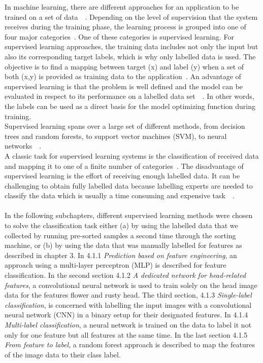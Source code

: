 In machine learning, there are different approaches for an application to be trained on a set of data~\citep{geron2019hands}~\citep{bishop2006pattern}. Depending on the level of supervision that the system receives during the training phase, the learning process is grouped into one of four major categories~\citep{geron2019hands}. One of these categories is supervised learning. For supervised learning approaches, the training data includes not only the input but also its corresponding target labels, which is why only labelled data is used. The objective is to find a mapping between target (x) and label (y) when a set of both (x,y) is provided as training data to the application~\citep{olivier2006semi}. An advantage of supervised learning is that the problem is well defined and the model can be evaluated in respect to its performance on a labelled data set~\citep{daume2012course}~\citep{olivier2006semi}. In other words, the labels can be used as a direct basis for the model optimizing function during training. \\
Supervised learning spans over a large set of different methods, from decision trees and random forests, to support vector machines (SVM), to neural networks~\citep{caruana2006comparison}~\citep{geron2019hands}. \\
A classic task for supervised learning systems is the classification of received data and mapping it to one of a finite number of categories~\citep{bishop2006pattern}.
The disadvantage of supervised learning is the effort of receiving enough labelled data. It can be challenging to obtain fully labelled data because labelling experts are needed to classify the data which is usually a time consuming and expensive task~\citep{zhu05survey}~\citep{figueroa2012predicting}. \\
\\
In the following subchapters, different supervised learning methods were chosen to solve the classification task either (a) by using the labelled data that we collected by running pre-sorted samples a second time through the sorting machine, or (b) by using the data that was manually labelled for features as described in chapter 3. In  4.1.1 \textit{Prediction based on feature engineering}, an approach using a multi-layer perceptron (MLP) is described for feature classification. In the second section 4.1.2 \textit{A dedicated network for head-related features}, a convolutional neural network is used to train solely on the head image data for the features flower and rusty head. The third section, 4.1.3 \textit{Single-label classification}, is concerned with labelling the input images with a convolutional neural network (CNN) in a binary setup for their designated features. In 4.1.4 \textit{Multi-label classification}, a neural network is trained on the data to label it not only for one feature but all features at the same time.
In the last section 4.1.5 \textit{From feature to label}, a random forest approach is described to map the features of the image data to their class label.



